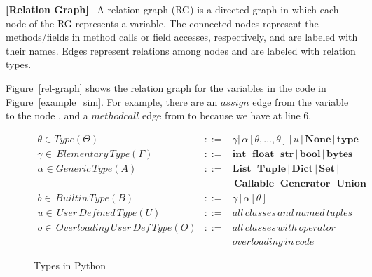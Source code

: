 \begin{definition}{\bf [Relation Graph]}~\cite{icse19}
A relation graph (RG) is a directed graph
%
in which each node of the RG represents a variable. The connected
nodes represent the methods/fields in method calls or field accesses,
respectively, and are labeled with their names. Edges represent
relations among nodes and are labeled with relation types.
\end{definition}

%



Figure~\ref{rel-graph} shows the relation graph for the variables in
the code in Figure~\ref{example_sim}. For example, there are an
$assign$ edge from the variable  to the node
, and a $methodcall$ edge from  to
 because we have  at line
6.




\begin{figure}[t]
  \small
  \begin{eqnarray*}
    \theta \in Type (\Theta) &::=& \gamma | \, \alpha [\theta, ..., \theta] \, | \, u \, | \, \mathbf{None} \, | \, \mathbf{type}\\
  \gamma \in \, Elementary \, Type (\Gamma) &::=& \mathbf{int} \, | \, \mathbf{float} \, | \, \mathbf{str} \, | \, \mathbf{bool} \, | \, \mathbf{bytes}\\
  \alpha \in Generic \, Type (A) &::=& \mathbf{List} \, | \, \mathbf{Tuple} \, | \, \mathbf{Dict} \, | \, \mathbf{Set} \, |\\
  & & \, \mathbf{Callable} \, | \, \mathbf{Generator} \, | \, \mathbf{Union}\\
  b \in \, Builtin \, Type (B) &::=& \gamma \, | \, \alpha[\theta]\\
  u \in \, User \, Defined \, Type (U) &::=& all \, classes \, and \, named \, tuples\\
  o \in \, Overloading \, User \, Def \, Type (O) &::=& all \, classes \, with \, operator \\
  & & overloading \, in \, code
  \end{eqnarray*}
  \vspace{-18pt}
\caption{Types in Python}
\label{python-types}
\end{figure}

